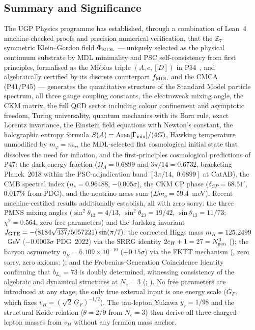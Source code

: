 \subsection{Summary and Significance}
\label{subsec:overview-summary}

The UGP Physics programme has established, through a combination of Lean~4 machine-checked
proofs and precision numerical verification, that the $\mathbb{Z}_7$-symmetric
Klein--Gordon field $\Phi_{\rm MDL}$ --- uniquely selected as the physical
continuum substrate by MDL minimality and PSC self-consistency from first
principles, formalised as the Möbius triple $(A,e,[D])$ in P34~\cite{SpivackGTEMobius},
and algebraically certified by its discrete counterpart $f_{\rm MDL}$ and the CMCA
(P41/P45) --- generates the quantitative structure of the Standard Model particle spectrum,
all three gauge coupling constants, the electroweak mixing angle, the CKM matrix,
the full QCD sector including colour confinement and asymptotic freedom, Turing
universality, quantum mechanics with its Born rule, exact Lorentz invariance, the
Einstein field equations with Newton's constant, the holographic entropy formula
$S(A) = \mathrm{Area}[\Gamma_{\rm min}]/(4G)$, Hawking temperature unmodified by
$m_\varphi = m_\tau$, the MDL-selected flat cosmological initial state that
dissolves the need for inflation, and the first-principles cosmological predictions
of P47: the dark-energy fraction ($\Omega_\Lambda = 0.6899$ and
$3\pi/14 = 0.6732$, bracketing Planck~2018 within the PSC-adjudication band $[3\pi/14,\;0.6899]$ at CatAD), the CMB spectral index ($n_s = 0.96488$, $-0.005\sigma$),
the CKM CP phase ($\delta_{CP} = 68.51^\circ$, $0.017\%$ from PDG), and the neutrino
mass sum ($\Sigma m_\nu = 59.4$~meV).
Recent machine-certified results additionally establish, all with zero sorry:
the three PMNS mixing angles ($\sin^2\theta_{12} = 4/13$, $\sin^2\theta_{23} = 19/42$,
$\sin\theta_{13} = 11/73$; $\chi^2 = 0.564$, zero free parameters) and the
Jarlskog invariant $J_{\rm GTE} = -(8184\sqrt{437}/5057221)\sin(\pi/7)$;
the corrected Higgs mass $m_H = 125.2499$~GeV ($-0.0003\sigma$ PDG~2022) via the
SRRG identity $2c_H+1=27=N_{\rm gen}^3$ (\CatAL);
the baryon asymmetry $\eta_B = 6.109\times10^{-10}$ ($+0.15\sigma$) via the FKTT mechanism
(\CatAL, zero sorry, zero axioms; ); and
the Frobenius-Generation Coincidence Identity confirming that
$b_{L_1} = 73$ is doubly determined, witnessing consistency of the algebraic and
dynamical structures at $N_c = 3$ (\CatAL; ).
No free parameters are introduced at any stage; the only true external input is one
energy scale ($G_F$, which fixes $v_H = (\sqrt{2}\,G_F)^{-1/2}$).  The tau-lepton
Yukawa $y_\tau = 1/98$ and the structural Koide relation ($\theta = 2/9$ from $N_c = 3$)
then derive all three charged-lepton masses from $v_H$ without any fermion mass anchor.

